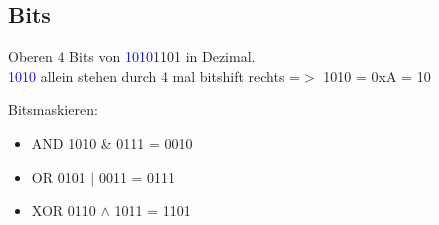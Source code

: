 \documentclass[12pt,a4paper,oneside,ngerman]{article}
\begin{document}
\subsection{Bits}
Oberen 4 Bits von \textcolor{blue}{1010}1101 in Dezimal. \\
\textcolor{blue}{1010} allein stehen durch 4 mal bitshift rechts =$>$ 1010 = 0xA = 10

Bitsmaskieren:
\begin{itemize}
	\item AND 1010 \& 0111 = 0010
	\item OR 0101 $|$ 0011 = 0111
	\item XOR 0110 $\wedge$ 1011 = 1101
\end{itemize}
\end{document}
